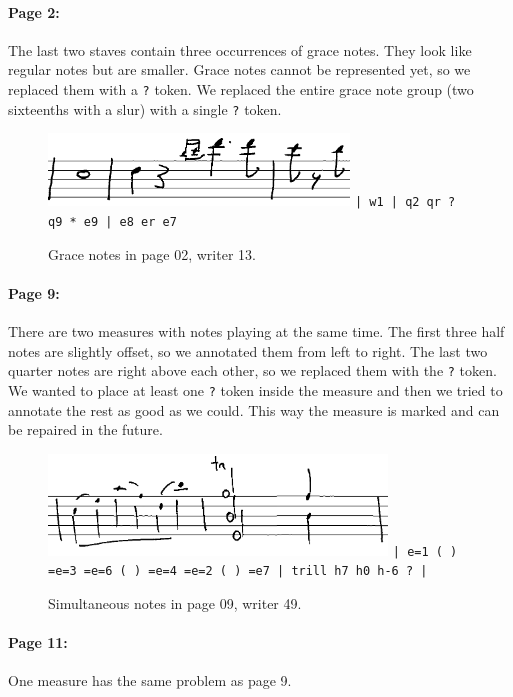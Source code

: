\paragraph{Page 2:} The last two staves contain three occurrences of grace notes. They look like regular notes but are smaller. Grace notes cannot be represented yet, so we replaced them with a \verb`?` token. We replaced the entire grace note group (two sixteenths with a slur) with a single \verb`?` token.

\begin{figure}[h]
    \centering
    \includegraphics[width=80mm]{../img/ae-02}
    \verb`| w1 | q2 qr ? q9 * e9 | e8 er e7`
    \caption{Grace notes in page 02, writer 13.}
    \label{fig6:AnnotationExperience02}
\end{figure}

\paragraph{Page 9:} There are two measures with notes playing at the same time. The first three half notes are slightly offset, so we annotated them from left to right. The last two quarter notes are right above each other, so we replaced them with the \verb`?` token. We wanted to place at least one \verb`?` token inside the measure and then we tried to annotate the rest as good as we could. This way the measure is marked and can be repaired in the future.

\begin{figure}[h]
    \centering
    \includegraphics[width=90mm]{../img/ae-09}
    \verb`| e=1 ( ) =e=3 =e=6 ( ) =e=4 =e=2 ( ) =e7 | trill h7 h0 h-6 ? |`
    \caption{Simultaneous notes in page 09, writer 49.}
    \label{fig6:AnnotationExperience09}
\end{figure}

\paragraph{Page 11:} One measure has the same problem as page 9.

